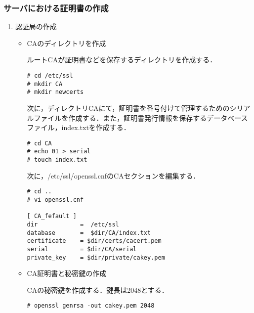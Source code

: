 \documentclass[a4j,titlepage]{jarticle}
\begin{document}
\subsubsection{サーバにおける証明書の作成}
\begin{enumerate}
\item 認証局の作成
\begin{itemize}
\item CAのディレクトリを作成

ルートCAが証明書などを保存するディレクトリを作成する．
\begin{center}
\begin{screen}
\begin{verbatim}
# cd /etc/ssl
# mkdir CA
# mkdir newcerts
\end{verbatim}
\end{screen}
\end{center}

次に，ディレクトリCAにて，証明書を番号付けて管理するためのシリアルファイルを作成する．また，証明書発行情報を保存するデータベースファイル，index.txtを作成する．

\begin{center}
\begin{screen}
\begin{verbatim}
# cd CA
# echo 01 > serial
# touch index.txt
\end{verbatim}
\end{screen}
\end{center}

次に，/etc/ssl/openssl.cnfのCAセクションを編集する．

\begin{center}
\begin{screen}
\begin{verbatim}
# cd ..
# vi openssl.cnf

[ CA_fefault ]
dir            =  /etc/ssl
database       =  $dir/CA/index.txt
certificate    = $dir/certs/cacert.pem
serial         = $dir/CA/serial
private_key    = $dir/private/cakey.pem
\end{verbatim}
\end{screen}
\end{center}

\item CA証明書と秘密鍵の作成

CAの秘密鍵を作成する．鍵長は2048とする．

\begin{center}
\begin{screen}
\begin{verbatim}
# openssl genrsa -out cakey.pem 2048
\end{verbatim}
\end{screen}
\end{center}


\end{itemize}
\end{enumerate}
\end{document}
